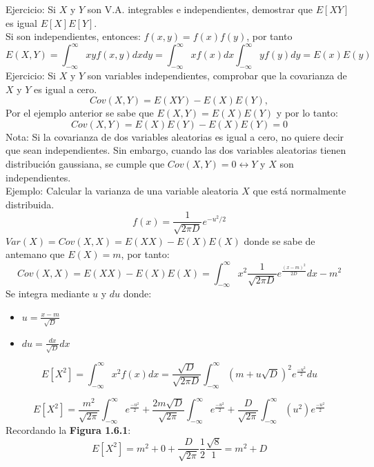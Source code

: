 \documentclass[11pt,fleqn]{book} %
\numberwithin{equation}{section} %
\numberwithin{figure}{section} %
\numberwithin{table}{section} %
\begin{document}
Ejercicio: Si $X$ y $Y$ son V.A. integrables e independientes, demostrar que $E[XY]$ es igual $E[X]E[Y]$.
\ \\%
Si son independientes, entonces: $f(x,y)=f(x)f(y)$, por tanto
$$E(X,Y) = \int_{-\infty}^{\infty} xy f(x,y)dxdy = \int_{-\infty}^{\infty} xf(x)dx \int_{-\infty}^{\infty} yf(y)dy = E(x)E(y)$$
Ejercicio: Si $X$ y $Y$ son variables independientes, comprobar que la covarianza de $X$ y $Y$ es igual a cero.
$$Cov(X,Y) = E(XY) - E(X)E(Y),$$
Por el ejemplo anterior se sabe que $E(X,Y) = E(X)E(Y)$ y por lo tanto:
$$Cov(X,Y)= E(X)E(Y) - E(X)E(Y) = 0$$
Nota: Si la covarianza de dos variables aleatorias es igual a cero, no quiere decir que sean independientes. Sin embargo, cuando las dos variables aleatorias tienen distribución gaussiana, se cumple que $Cov(X,Y) = 0 \leftrightarrow Y$ y $X$ son independientes. 
\ \\%
Ejemplo: Calcular la varianza de una variable aleatoria $X$ que está normalmente distribuida.
$$f(x)= \frac{1}{\sqrt{2\pi D}} e^{-u^2/2}$$
$Var(X)=Cov(X,X)=E(XX)-E(X)E(X)$ donde se sabe de antemano que $E(X)=m$, por tanto:
$$Cov(X,X)= E(XX)-E(X)E(X) = \int_{-\infty}^{\infty} x^2 \frac{1}{\sqrt{2\pi D}} e^{\frac{(x-m)^2}{2D}} dx - m^2$$
Se integra mediante $u$ y $du$ donde:
\begin{itemize}
    \item $ u = \frac{x-m}{\sqrt{D}} $ 
    \item $ du = \frac{dx}{\sqrt{D}} dx$
\end{itemize}
$$ E[X^2] = \int_{-\infty}^{\infty} x^{2} f(x) dx = \frac{\sqrt{D}}{\sqrt{2 \pi D}} \int_{-\infty}^{\infty}(m+u\sqrt{D})^{2} e^{\frac{-u^{2}}{2}} du$$

$$  E[X^2] = \frac{m^{2}}{\sqrt{2 \pi}} \int_{-\infty}^{\infty} e^{\frac{-u^{2}}{2}} + \frac{2m\sqrt{D}}{\sqrt{2 \pi}} \int_{-\infty}^{\infty} e^{\frac{-u^{2}}{2}} + \frac{D}{\sqrt{2 \pi}} \int_{-\infty}^{\infty} (u^{2})e^{\frac{-u^{2}}{2}}$$
Recordando la \textbf{Figura 1.6.1}:
$$  E[X^2] = m^{2} + 0 + \frac{D}{\sqrt{2\pi}} \frac{1}{2} \frac{\sqrt{8}}{1} = m^{2} + D$$
\end{document}
